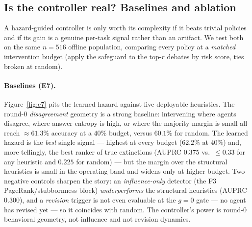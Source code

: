 %

\subsection{Is the controller real? Baselines and ablation}
\label{sec:rq7}

A hazard-guided controller is only worth its complexity if it beats trivial policies
and if its gain is a genuine per-task signal rather than an artifact. We test both on
the same $n=516$ offline population, comparing every policy at a \emph{matched}
intervention budget (apply the safeguard to the top-$r$ debates by risk score, ties
broken at random).

\paragraph{Baselines (E7).}
Figure~\ref{fig:e7} pits the learned hazard against five deployable heuristics. The
round-0 \emph{disagreement} geometry is a strong baseline: intervening where agents
disagree, where answer-entropy is high, or where the majority margin is small all reach
$\approx\!61.3\%$ accuracy at a $40\%$ budget, versus $60.1\%$ for random. The learned
hazard is the \emph{best} single signal --- highest at every budget ($62.2\%$ at $40\%$)
and, more tellingly, the best ranker of true extinctions (AUPRC $0.375$ vs.\ $\le0.33$
for any heuristic and $0.225$ for random) --- but the margin over the structural
heuristics is small in the operating band and widens only at higher budget. Two
negative controls sharpen the story: an \emph{influence-only} detector (the F3
PageRank/stub\-bornness block) \emph{underperforms} the structural heuristics
(AUPRC $0.300$), and a \emph{revision} trigger is not even evaluable at the $g=0$ gate
--- no agent has revised yet --- so it coincides with random. The controller's power is
round-0 behavioral geometry, not influence and not revision dynamics.

